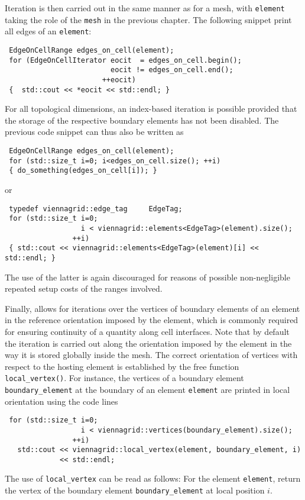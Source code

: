 Iteration is then carried out in the same manner as for a mesh, with \lstinline|element| taking the role of the \lstinline|mesh| in the previous chapter.
The following snippet print all edges of an \lstinline|element|:
\begin{lstlisting}
 EdgeOnCellRange edges_on_cell(element);
 for (EdgeOnCellIterator eocit  = edges_on_cell.begin();
                         eocit != edges_on_cell.end();
                       ++eocit)
 {  std::cout << *eocit << std::endl; }
\end{lstlisting}

For all topological dimensions, an index-based iteration is possible provided that the storage of the respective boundary elements has not been disabled. The previous code snippet can thus also be written as
\begin{lstlisting}
 EdgeOnCellRange edges_on_cell(element);
 for (std::size_t i=0; i<edges_on_cell.size(); ++i)
 { do_something(edges_on_cell[i]); }
\end{lstlisting}
or
\begin{lstlisting}
 typedef viennagrid::edge_tag     EdgeTag;
 for (std::size_t i=0;
                  i < viennagrid::elements<EdgeTag>(element).size();
                ++i)
 { std::cout << viennagrid::elements<EdgeTag>(element)[i] << std::endl; }
\end{lstlisting}
The use of the latter is again discouraged for reasons of possible non-negligible repeated setup costs of the ranges involved.


Finally, {\ViennaGrid} allows for iterations over the vertices of boundary elements of an element in the reference orientation imposed by the element, which is commonly required for ensuring continuity of a quantity along cell interfaces. Note that by default the iteration is carried out along the orientation imposed by the element in the way it is stored globally inside the mesh.
The correct orientation of vertices with respect to the hosting element is established by the free function \lstinline|local_vertex()|.
For instance, the vertices of a boundary element \lstinline|boundary_element| at the boundary of an element \lstinline|element| are printed in local orientation using the code lines
\begin{lstlisting}
 for (std::size_t i=0;
                  i < viennagrid::vertices(boundary_element).size();
                ++i)
   std::cout << viennagrid::local_vertex(element, boundary_element, i)
             << std::endl;
\end{lstlisting}
The use of \lstinline|local_vertex| can be read as follows: For the element \lstinline|element|, return the vertex of the boundary element \lstinline|boundary_element| at local position $i$.

